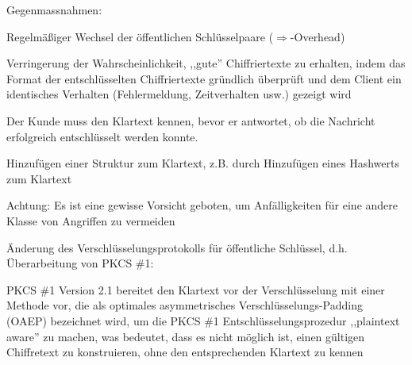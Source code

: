\documentclass[a4paper]{article}
\begin{document}
\begin{multicols}{3}
\begin{itemize*}
            \item Gegenmassnahmen:
            \begin{itemize*}
                  \item Regelmäßiger Wechsel der öffentlichen Schlüsselpaare ($\Rightarrow$-Overhead)
                  \item Verringerung der Wahrscheinlichkeit, ,,gute'' Chiffriertexte zu erhalten, indem das Format der entschlüsselten Chiffriertexte gründlich überprüft und dem Client ein identisches Verhalten (Fehlermeldung, Zeitverhalten usw.) gezeigt wird
                  \item Der Kunde muss den Klartext kennen, bevor er antwortet, ob die Nachricht erfolgreich entschlüsselt werden konnte.
                  \item Hinzufügen einer Struktur zum Klartext, z.B. durch Hinzufügen eines Hashwerts zum Klartext
                  \item Achtung: Es ist eine gewisse Vorsicht geboten, um Anfälligkeiten für eine andere Klasse von Angriffen zu vermeiden
                  \item Änderung des Verschlüsselungsprotokolls für öffentliche Schlüssel, d.h. Überarbeitung von PKCS \#1:
                  \begin{itemize*}
                        \item PKCS \#1 Version 2.1 bereitet den Klartext vor der Verschlüsselung mit einer Methode vor, die als optimales asymmetrisches Verschlüsselungs-Padding (OAEP) bezeichnet wird, um die PKCS \#1 Entschlüsselungsprozedur ,,plaintext aware'' zu machen, was bedeutet, dass es nicht möglich ist, einen gültigen Chiffretext zu konstruieren, ohne den entsprechenden Klartext zu kennen
                  \end{itemize*}
            \end{itemize*}
      \end{itemize*}


\end{multicols}
\end{document}
